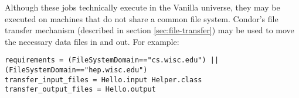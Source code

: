 Although these jobs technically execute in the Vanilla universe,
they may be executed on machines that do not share a common file
system.  Condor's file transfer mechanism (described in section
\ref{sec:file-transfer}) may be used to move the necessary data
files in and out.  For example:

\begin{verbatim}
requirements = (FileSystemDomain=="cs.wisc.edu") || (FileSystemDomain=="hep.wisc.edu")
transfer_input_files = Hello.input Helper.class
transfer_output_files = Hello.output
\end{verbatim}



